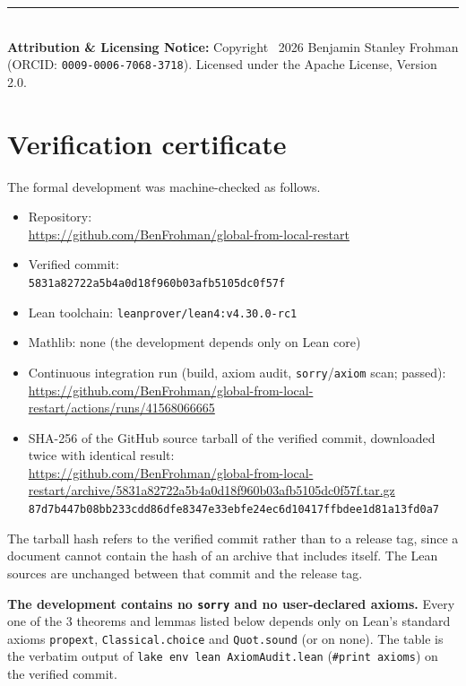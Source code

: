 \documentclass[11pt,a4paper]{article}
\begin{document}
\vfill
\noindent\rule{\textwidth}{0.4pt}\\
\footnotesize
\textbf{Attribution \& Licensing Notice:} Copyright \textcopyright\ 2026 Benjamin Stanley Frohman (ORCID: \texttt{0009-0006-7068-3718}).
Licensed under the Apache License, Version 2.0.
\appendix
\section{Verification certificate}\label{app:verification-certificate}

The formal development was machine-checked as follows.

{\raggedright
\begin{itemize}
\item Repository:\\ {\footnotesize\url{https://github.com/BenFrohman/global-from-local-restart}}
\item Verified commit:\\ {\footnotesize\texttt{5831a82722a5b4a0d18f960b03afb5105dc0f57f}}
\item Lean toolchain: \texttt{leanprover/lean4:v4.30.0-rc1}
\item Mathlib: none (the development depends only on Lean core)
\item Continuous integration run (build, axiom audit, \texttt{sorry}/\texttt{axiom} scan; passed):\\ {\footnotesize\url{https://github.com/BenFrohman/global-from-local-restart/actions/runs/41568066665}}
\item SHA-256 of the GitHub source tarball of the verified commit, downloaded twice with identical result:\\ {\footnotesize\url{https://github.com/BenFrohman/global-from-local-restart/archive/5831a82722a5b4a0d18f960b03afb5105dc0f57f.tar.gz}}\\
{\footnotesize\texttt{87d7b447b08bb233cdd86dfe8347e33ebfe24ec6d10417ffbdee1d81a13fd0a7}}
\end{itemize}\par}

The tarball hash refers to the verified commit rather than to a release tag, since a document cannot contain the hash of an archive that includes itself. The Lean sources are unchanged between that commit and the release tag.

\textbf{The development contains no \texttt{sorry} and no user-declared axioms.} Every one of the 3 theorems and lemmas listed below depends only on Lean's standard axioms \texttt{propext}, \texttt{Classical.choice} and \texttt{Quot.sound} (or on none). The table is the verbatim output of \texttt{lake env lean AxiomAudit.lean} (\texttt{\#print axioms}) on the verified commit.
\end{document}
